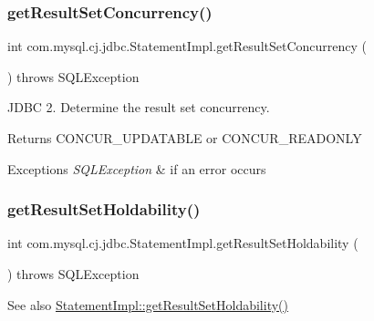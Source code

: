 \subsubsection{\texorpdfstring{get\+Result\+Set\+Concurrency()}{getResultSetConcurrency()}}
{\footnotesize\ttfamily int com.\+mysql.\+cj.\+jdbc.\+Statement\+Impl.\+get\+Result\+Set\+Concurrency (\begin{DoxyParamCaption}{ }\end{DoxyParamCaption}) throws S\+Q\+L\+Exception}

J\+D\+BC 2. Determine the result set concurrency.

\begin{DoxyReturn}{Returns}
C\+O\+N\+C\+U\+R\+\_\+\+U\+P\+D\+A\+T\+A\+B\+LE or C\+O\+N\+C\+U\+R\+\_\+\+R\+E\+A\+D\+O\+N\+LY
\end{DoxyReturn}

\begin{DoxyExceptions}{Exceptions}
{\em S\+Q\+L\+Exception} & if an error occurs \\
\hline
\end{DoxyExceptions}
\mbox{\label{classcom_1_1mysql_1_1cj_1_1jdbc_1_1_statement_impl_a84b0f5b22d3ce2bd808aceb6c17e4620}} 
\subsubsection{\texorpdfstring{get\+Result\+Set\+Holdability()}{getResultSetHoldability()}}
{\footnotesize\ttfamily int com.\+mysql.\+cj.\+jdbc.\+Statement\+Impl.\+get\+Result\+Set\+Holdability (\begin{DoxyParamCaption}{ }\end{DoxyParamCaption}) throws S\+Q\+L\+Exception}

\begin{DoxySeeAlso}{See also}
\mbox{\hyperlink{classcom_1_1mysql_1_1cj_1_1jdbc_1_1_statement_impl_a84b0f5b22d3ce2bd808aceb6c17e4620}{Statement\+Impl\+::get\+Result\+Set\+Holdability()}} 
\end{DoxySeeAlso}
\mbox{\label{classcom_1_1mysql_1_1cj_1_1jdbc_1_1_statement_impl_a0845a6219a16770f3675269fc28ade3b}} 
